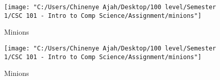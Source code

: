 \documentclass{article}
\begin{document}
	\begin{figure}
		\texttt{[image: "C:/Users/Chinenye Ajah/Desktop/100 level/Semester 1/CSC 101 - Intro to Comp Science/Assignment/minions"]}
		\caption{Minions}
		\label{fig:minions}
	\end{figure}
	\begin{figure}
	\texttt{[image: "C:/Users/Chinenye Ajah/Desktop/100 level/Semester 1/CSC 101 - Intro to Comp Science/Assignment/minions"]}
	\caption{Minions}
	\label{fig:minions}
\end{figure}
	
\end{document}

